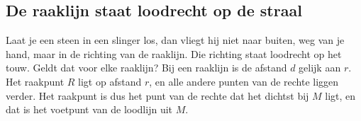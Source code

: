 \begin{oefeningen}
\end{oefeningen}

\subsection{De raaklijn staat loodrecht op de straal}

Laat je een steen in een slinger los, dan vliegt hij niet naar buiten, weg van je hand, maar in de richting van de raaklijn. Die richting staat loodrecht op het touw. Geldt dat voor elke raaklijn? Bij een raaklijn is de afstand $d$ gelijk aan $r$. Het raakpunt $R$ ligt op afstand $r$, en alle andere punten van de rechte liggen verder. Het raakpunt is dus het punt van de rechte dat het dichtst bij $M$ ligt, en dat is het voetpunt van de loodlijn uit $M$.

